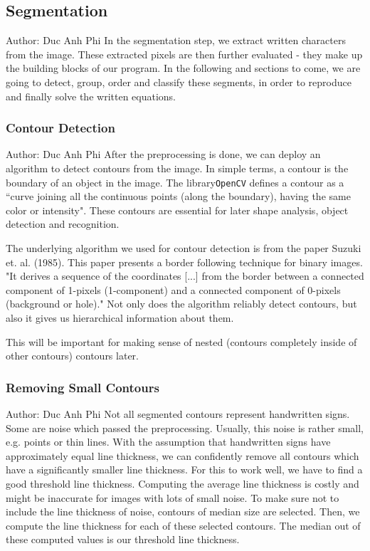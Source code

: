 \documentclass[12pt]{article}
\begin{document}
	
	
	
	\subsection{Segmentation}
		\small{Author: Duc Anh Phi} \newline \newline
	In the segmentation step, we extract written characters from the image.
	These extracted pixels are then further evaluated - they make up the building blocks of our program.
	In the following and sections to come, we are going to detect, group, order and classify these segments, in order to
	reproduce and finally solve the written equations.
	
	\subsubsection{Contour Detection}
	\small{Author: Duc Anh Phi} \newline \newline
	After the preprocessing is done, we can deploy an algorithm to detect contours from the image.
	In simple terms, a contour is the boundary of an object in the image.
	The library\texttt{OpenCV} defines a contour as a ``curve joining all the continuous points (along the boundary), having the same color or intensity".
	These contours are essential for later shape analysis, object detection and recognition.
	
	The underlying algorithm we used for contour detection is from the paper Suzuki et. al. (1985).
	This paper presents a border following technique for binary images. "It derives a sequence of the coordinates [...]
	from the border between a connected component of 1-pixels (1-component) and a connected component of 0-pixels (background or hole)."
	Not only does the algorithm reliably detect contours, but also it gives us hierarchical information about them.
	
	This will be important for making sense of nested (contours completely inside of other contours) contours later.
	
	\subsubsection{Removing Small Contours}
	\small{Author: Duc Anh Phi} \newline \newline
	Not all segmented contours represent handwritten signs.
	Some are noise which passed the preprocessing. Usually, this noise is rather small, e.g. points or thin lines.
	With the assumption that handwritten signs have approximately equal line thickness, we can confidently remove all contours which have a significantly smaller line thickness.
	For this to work well, we have to find a good threshold line thickness.
	Computing the average line thickness is costly and might be inaccurate for images with lots of small noise.
	To make sure not to include the line thickness of noise, contours of median size are selected. Then, we compute the line thickness for each of these selected contours.
	The median out of these computed values is our threshold line thickness.
	
\end{document}

